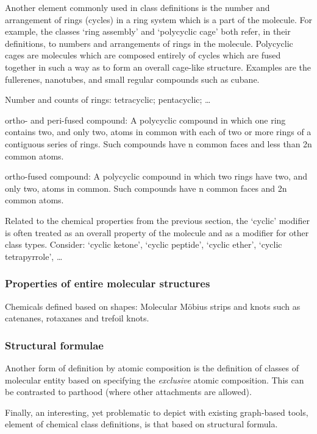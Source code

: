 \documentclass[10pt]{bmc_article}
\newenvironment{bmcformat}{\baselineskip20pt\sloppy\setboolean{publ}{false}}{\baselineskip20pt\sloppy}
\begin{document}
\begin{bmcformat}
Another element commonly used in class definitions is the number and arrangement of rings (cycles) in a ring system which is a part of the molecule. For example, the classes `ring assembly' and `polycyclic cage' both refer, in their definitions, to numbers and arrangements of rings in the molecule. Polycyclic cages are molecules which are composed entirely of cycles which are fused together in such a way as to form an overall cage-like structure.  Examples are the fullerenes, nanotubes, and small regular compounds such as cubane. 

Number and counts of rings: tetracyclic; pentacyclic; \ldots

ortho- and peri-fused compound: A polycyclic compound in which one ring contains two, and only two, atoms in common with each of two or more rings of a contiguous series of rings. Such compounds have n common faces and less than 2n common atoms.

ortho-fused compound: A polycyclic compound in which two rings have two, and only two, atoms in common. Such compounds have n common faces and 2n common atoms.

Related to the chemical properties from the previous section, the `cyclic' modifier is often treated as an overall property of the molecule and as a modifier for other class types. Consider: `cyclic ketone', `cyclic peptide', `cyclic ether', `cyclic tetrapyrrole', \ldots


\subsubsection*{Properties of entire molecular structures}

Chemicals defined based on shapes: Molecular M\"{o}bius strips and knots such as catenanes, rotaxanes and trefoil knots. 



\subsubsection*{Structural formulae}
\label{sec:molformula}

Another form of definition by atomic composition is the definition of classes of molecular entity based on specifying the \textit{exclusive} atomic composition.  This can be contrasted to parthood (where other attachments are allowed). 

Finally, an interesting, yet problematic to depict with existing graph-based tools, element of chemical class definitions, is that based on structural formula. 


\end{bmcformat}
\end{document}
